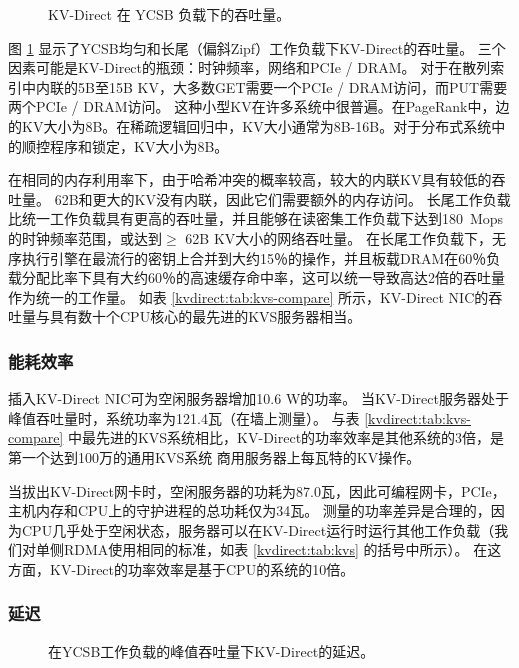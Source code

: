 \begin{figure}[t]
\centering
{}
\caption{KV-Direct 在 YCSB 负载下的吞吐量。}
\label{kvdirect:fig:ycsb-tput}

\end{figure}

图 \ref {kvdirect:fig:ycsb-tput} 显示了YCSB均匀和长尾（偏斜Zipf）工作负载下KV-Direct的吞吐量。
三个因素可能是KV-Direct的瓶颈：时钟频率，网络和PCIe / DRAM。
对于在散列索引中内联的5B至15B KV，大多数GET需要一个PCIe / DRAM访问，而PUT需要两个PCIe / DRAM访问。
这种小型KV在许多系统中很普遍。在PageRank中，边的KV大小为8B。在稀疏逻辑回归中，KV大小通常为8B-16B。对于分布式系统中的顺控程序和锁定，KV大小为8B。

在相同的内存利用率下，由于哈希冲突的概率较高，较大的内联KV具有较低的吞吐量。
62B和更大的KV没有内联，因此它们需要额外的内存访问。
长尾工作负载比统一工作负载具有更高的吞吐量，并且能够在读密集工作负载下达到180~Mops的时钟频率范围，或达到$ \geq $ 62B KV大小的网络吞吐量。
在长尾工作负载下，无序执行引擎在最流行的密钥上合并到大约15％的操作，并且板载DRAM在60％负载分配比率下具有大约60％的高速缓存命中率，这可以统一导致高达2倍的吞吐量作为统一的工作量。
如表 \ref {kvdirect:tab:kvs-compare} 所示，KV-Direct NIC的吞吐量与具有数十个CPU核心的最先进的KVS服务器相当。

\subsubsection{能耗效率}

插入KV-Direct NIC可为空闲服务器增加10.6 W的功率。
当KV-Direct服务器处于峰值吞吐量时，系统功率为121.4瓦（在墙上测量）。
与表 \ref {kvdirect:tab:kvs-compare} 中最先进的KVS系统相比，KV-Direct的功率效率是其他系统的3倍，是第一个达到100万的通用KVS系统 商用服务器上每瓦特的KV操作。

当拔出KV-Direct网卡时，空闲服务器的功耗为87.0瓦，因此可编程网卡，PCIe，主机内存和CPU上的守护进程的总功耗仅为34瓦。
测量的功率差异是合理的，因为CPU几乎处于空闲状态，服务器可以在KV-Direct运行时运行其他工作负载（我们对单侧RDMA使用相同的标准，如表 \ref {kvdirect:tab:kvs} 的括号中所示）。
在这方面，KV-Direct的功率效率是基于CPU的系统的10倍。

\subsubsection{延迟}
\begin{figure}[t]
\centering
{}
\caption{在YCSB工作负载的峰值吞吐量下KV-Direct的延迟。}
\label{kvdirect:fig:ycsb-lat}

\end{figure}

